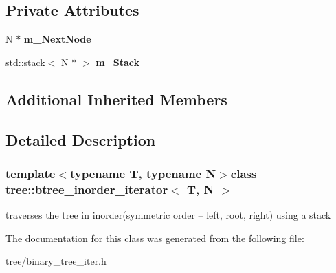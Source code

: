 \subsection*{Private Attributes}
\begin{DoxyCompactItemize}
\item 
\hypertarget{classtree_1_1btree__inorder__iterator_aa2586ca852a9b462b0774af427a7a10f}{N $\ast$ {\bfseries m\-\_\-\-Next\-Node}}\label{classtree_1_1btree__inorder__iterator_aa2586ca852a9b462b0774af427a7a10f}

\item 
\hypertarget{classtree_1_1btree__inorder__iterator_a35c2412b7ad6f89a8ca7eeb2eef3f413}{std\-::stack$<$ N $\ast$ $>$ {\bfseries m\-\_\-\-Stack}}\label{classtree_1_1btree__inorder__iterator_a35c2412b7ad6f89a8ca7eeb2eef3f413}

\end{DoxyCompactItemize}
\subsection*{Additional Inherited Members}


\subsection{Detailed Description}
\subsubsection*{template$<$typename T, typename N$>$class tree\-::btree\-\_\-inorder\-\_\-iterator$<$ T, N $>$}

traverses the tree in inorder(symmetric order -- left, root, right) using a stack 

The documentation for this class was generated from the following file\-:\begin{DoxyCompactItemize}
\item 
tree/binary\-\_\-tree\-\_\-iter.\-h\end{DoxyCompactItemize}
